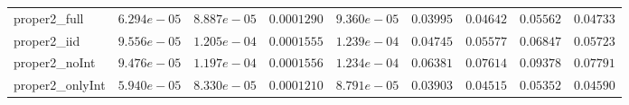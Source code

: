 \begin{table}
\begin{tabular}{lcccccccc}
proper2_full  & $6.294e-05$ & $8.887e-05$ & $0.0001290$ & $9.360e-05$ & $0.03995$ & $0.04642$ & $0.05562$ & $0.04733$ \\
proper2_iid  & $9.556e-05$ & $1.205e-04$ & $0.0001555$ & $1.239e-04$ & $0.04745$ & $0.05577$ & $0.06847$ & $0.05723$ \\
proper2_noInt  & $9.476e-05$ & $1.197e-04$ & $0.0001556$ & $1.234e-04$ & $0.06381$ & $0.07614$ & $0.09378$ & $0.07791$ \\
proper2_onlyInt  & $5.940e-05$ & $8.330e-05$ & $0.0001210$ & $8.791e-05$ & $0.03903$ & $0.04515$ & $0.05352$ & $0.04590$ \\
\hline 
\end{tabular}


\end{table}